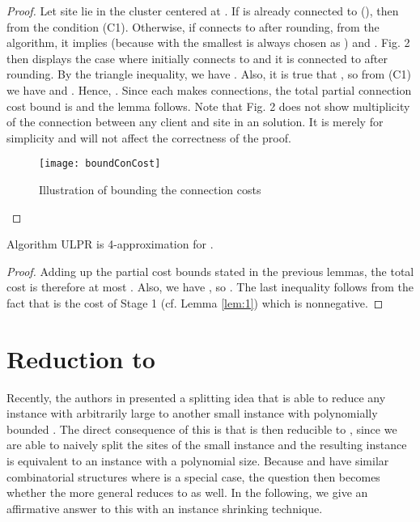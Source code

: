 \documentclass[10pt]{llncs}
\begin{document}
\begin{proof}
Let site  lie in the cluster  centered at .
If  is already connected to  (), then 
from the condition (C1). Otherwise, if  connects to  after
rounding, from the algorithm, it implies 
(because  with the smallest  is always chosen
as ) and . Fig.
2 then displays the case 
where initially  connects to  and it is connected to 
after rounding. By the triangle inequality, we have .
Also, it is true that ,
so from (C1) we have  and .
Hence, .
Since each  makes  connections, the total partial
connection cost bound is 
and the lemma follows. Note that Fig. 2 does not show multiplicity
of the connection between any client and site in an  solution.
It is merely for simplicity and will not affect the correctness of
the proof.
\begin{figure}
\begin{centering}
\texttt{[image: boundConCost]}
\par\end{centering}

\caption{Illustration of bounding the connection costs}
\end{figure}
\end{proof}
\begin{theorem}
Algorithm ULPR is 4-approximation for .\end{theorem}
\begin{proof}
Adding up the partial cost bounds stated in the previous lemmas, the
total cost  is
therefore at most .
Also, we have ,
so .
The last inequality follows from the fact that 
is the cost of Stage 1 (cf. Lemma \ref{lem:1}) which is nonnegative.
\end{proof}

\section{Reduction to }

Recently, the authors in \cite{yan2011newresults} presented a splitting
idea that is able to reduce any  instance with arbitrarily
large  to another small  instance with polynomially
bounded . The direct consequence of this is that 
is then reducible to , since we are able to naively split the
sites of the small  instance and the resulting instance
is equivalent to an  instance with a polynomial size. Because
 and  have similar combinatorial structures
where  is a special case, the question then becomes
whether the more general  reduces to  as well. In the
following, we give an affirmative answer to this with an instance
shrinking technique.
\end{document}
